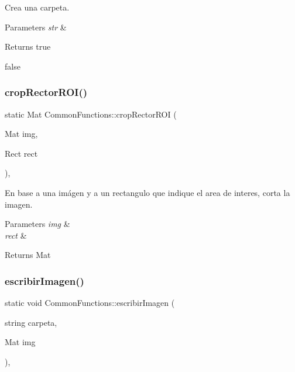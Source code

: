 Crea una carpeta. 


\begin{DoxyParams}{Parameters}
{\em str} & \\
\hline
\end{DoxyParams}
\begin{DoxyReturn}{Returns}
true 

false 
\end{DoxyReturn}
\mbox{\label{classCommonFunctions_a59211fa9ca611fd09496f4e376649ab2}} 
\subsubsection{\texorpdfstring{crop\+Rector\+R\+O\+I()}{cropRectorROI()}}
{\footnotesize\ttfamily static Mat Common\+Functions\+::crop\+Rector\+R\+OI (\begin{DoxyParamCaption}\item[{Mat}]{img,  }\item[{Rect}]{rect }\end{DoxyParamCaption})\hspace{0.3cm}{\ttfamily [inline]}, {\ttfamily [static]}}



En base a una imágen y a un rectangulo que indique el area de interes, corta la imagen. 


\begin{DoxyParams}{Parameters}
{\em img} & \\
\hline
{\em rect} & \\
\hline
\end{DoxyParams}
\begin{DoxyReturn}{Returns}
Mat 
\end{DoxyReturn}
\mbox{\label{classCommonFunctions_a1cbb74aeab1ac5dc96ba4871d0f07792}} 
\subsubsection{\texorpdfstring{escribir\+Imagen()}{escribirImagen()}}
{\footnotesize\ttfamily static void Common\+Functions\+::escribir\+Imagen (\begin{DoxyParamCaption}\item[{string}]{carpeta,  }\item[{Mat}]{img }\end{DoxyParamCaption})\hspace{0.3cm}{\ttfamily [inline]}, {\ttfamily [static]}}



